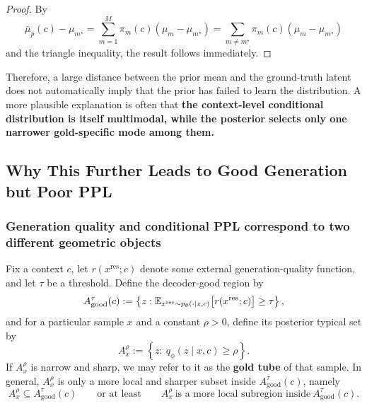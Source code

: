 \begin{proof}
By
\[
\bar\mu_p(c)-\mu_{m^{\star}}
=
\sum_{m=1}^{M}\pi_m(c)(\mu_m-\mu_{m^{\star}})
=
\sum_{m\neq m^{\star}}\pi_m(c)(\mu_m-\mu_{m^{\star}})
\]
and the triangle inequality, the result follows immediately.
\end{proof}

Therefore, a large distance between the prior mean and the ground-truth latent does not automatically imply that the prior has failed to learn the distribution. A more plausible explanation is often that \textbf{the context-level conditional distribution is itself multimodal, while the posterior selects only one narrower gold-specific mode among them.}

\subsection{Why This Further Leads to Good Generation but Poor PPL}

\subsubsection{Generation quality and conditional PPL correspond to two different geometric objects}

Fix a context $c$, let $r(x^{\mathrm{res}};c)$ denote some external generation-quality function, and let $\tau$ be a threshold. Define the decoder-good region by
\begin{equation}
A_{\mathrm{good}}^{\tau}(c)
:=
\left\{
z:
\mathbb{E}_{x^{\mathrm{res}}\sim p_{\theta}(\cdot\mid z,c)}
\bigl[r(x^{\mathrm{res}};c)\bigr]\ge \tau
\right\},
\label{eq:good_region_appendix}
\end{equation}
and for a particular sample $x$ and a constant $\rho>0$, define its posterior typical set by
\begin{equation}
A_x^{\rho}
:=
\left\{
z:\ q_{\phi}(z\mid x,c)\ge \rho
\right\}.
\label{eq:gold_tube_appendix}
\end{equation}
If $A_x^{\rho}$ is narrow and sharp, we may refer to it as the \textbf{gold tube} of that sample. In general, $A_x^{\rho}$ is only a more local and sharper subset inside $A_{\mathrm{good}}^{\tau}(c)$, namely
\begin{equation}
A_x^{\rho}\subseteq A_{\mathrm{good}}^{\tau}(c)
\qquad\text{or at least}\qquad
A_x^{\rho}\ \text{is a more local subregion inside}\ A_{\mathrm{good}}^{\tau}(c).
\label{eq:gold_tube_inside_good_region_appendix}
\end{equation}

